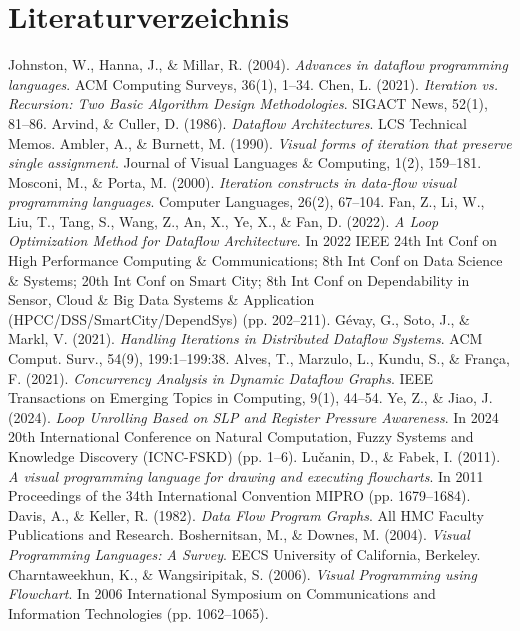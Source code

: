 \documentclass{article}
\begin{document}
    \section{Literaturverzeichnis}
    \begin{thebibliography}{9}
        Johnston, W., Hanna, J., \& Millar, R. (2004). \emph{Advances in dataflow programming languages}. ACM Computing Surveys, 36(1), 1–34.
        Chen, L. (2021). \emph{Iteration vs. Recursion: Two Basic Algorithm Design Methodologies}. SIGACT News, 52(1), 81–86.
        Arvind, \& Culler, D. (1986). \emph{Dataflow Architectures}. LCS Technical Memos.
        Ambler, A., \& Burnett, M. (1990). \emph{Visual forms of iteration that preserve single assignment}. Journal of Visual Languages \& Computing, 1(2), 159–181.
        Mosconi, M., \& Porta, M. (2000). \emph{Iteration constructs in data-flow visual programming languages}. Computer Languages, 26(2), 67–104.
        Fan, Z., Li, W., Liu, T., Tang, S., Wang, Z., An, X., Ye, X., \& Fan, D. (2022). \emph{A Loop Optimization Method for Dataflow Architecture}. In 2022 IEEE 24th Int Conf on High Performance Computing \& Communications; 8th Int Conf on Data Science \& Systems; 20th Int Conf on Smart City; 8th Int Conf on Dependability in Sensor, Cloud \& Big Data Systems \& Application (HPCC/DSS/SmartCity/DependSys) (pp. 202–211).
        Gévay, G., Soto, J., \& Markl, V. (2021). \emph{Handling Iterations in Distributed Dataflow Systems}. ACM Comput. Surv., 54(9), 199:1–199:38.
        Alves, T., Marzulo, L., Kundu, S., \& França, F. (2021). \emph{Concurrency Analysis in Dynamic Dataflow Graphs}. IEEE Transactions on Emerging Topics in Computing, 9(1), 44–54.
        Ye, Z., \& Jiao, J. (2024). \emph{Loop Unrolling Based on SLP and Register Pressure Awareness}. In 2024 20th International Conference on Natural Computation, Fuzzy Systems and Knowledge Discovery (ICNC-FSKD) (pp. 1–6).
        Lučanin, D., \& Fabek, I. (2011). \emph{A visual programming language for drawing and executing flowcharts}. In 2011 Proceedings of the 34th International Convention MIPRO (pp. 1679–1684).
        Davis, A., \& Keller, R. (1982). \emph{Data Flow Program Graphs}. All HMC Faculty Publications and Research.
        Boshernitsan, M., \& Downes, M. (2004). \emph{Visual Programming Languages: A Survey}. EECS University of California, Berkeley.
        Charntaweekhun, K., \& Wangsiripitak, S. (2006). \emph{Visual Programming using Flowchart}. In 2006 International Symposium on Communications and Information Technologies (pp. 1062–1065).

\end{thebibliography}
\end{document}
